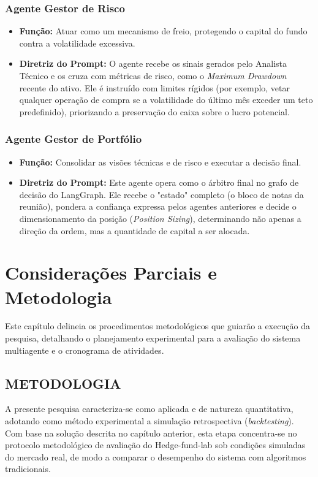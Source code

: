 \documentclass{eic-bcc-tcc}
\begin{document}
\subsection{Agente Gestor de Risco}
\begin{itemize}
    \item \textbf{Função:} Atuar como um mecanismo de freio, protegendo o capital do fundo contra a volatilidade excessiva.
    \item \textbf{Diretriz do Prompt:} O agente recebe os sinais gerados pelo Analista Técnico e os cruza com métricas de risco, como o \textit{Maximum Drawdown} recente do ativo. Ele é instruído com limites rígidos (por exemplo, vetar qualquer operação de compra se a volatilidade do último mês exceder um teto predefinido), priorizando a preservação do caixa sobre o lucro potencial.
\end{itemize}

\subsection{Agente Gestor de Portfólio}
\begin{itemize}
    \item \textbf{Função:} Consolidar as visões técnicas e de risco e executar a decisão final.
    \item \textbf{Diretriz do Prompt:} Este agente opera como o árbitro final no grafo de decisão do LangGraph. Ele recebe o "estado" completo (o bloco de notas da reunião), pondera a confiança expressa pelos agentes anteriores e decide o dimensionamento da posição (\textit{Position Sizing}), determinando não apenas a direção da ordem, mas a quantidade de capital a ser alocada.
\end{itemize}

\chapter{Considerações Parciais e Metodologia}
\label{cha:resultados}

Este capítulo delineia os procedimentos metodológicos que guiarão a execução da pesquisa, detalhando o planejamento experimental para a avaliação do sistema multiagente e o cronograma de atividades.

\section{METODOLOGIA}

A presente pesquisa caracteriza-se como aplicada e de natureza quantitativa, adotando como método experimental a simulação retrospectiva (\textit{backtesting}). Com base na solução descrita no capítulo anterior, esta etapa concentra-se no protocolo metodológico de avaliação do Hedge-fund-lab sob condições simuladas do mercado real, de modo a comparar o desempenho do sistema com algoritmos tradicionais.
\end{document}
